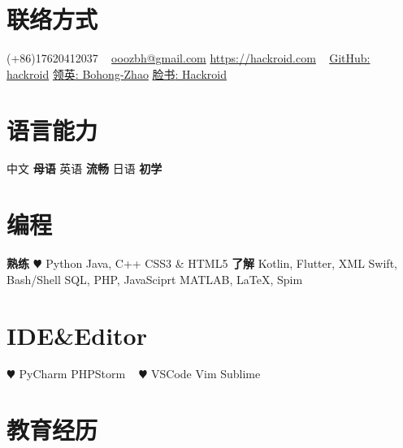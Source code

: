 \documentclass[hidelinks__VERSION__]{adamyi-cv}
\begin{document}



\begin{aside} %
\section{\heir 联络方式}
(+86)17620412037
~
\href{mailto:ooozbh@gmail.com}{ooozbh@gmail.com}
\href{https://hackroid.com}{https://hackroid.com}
~
\href{https://github.com/hackroid}{GitHub: hackroid}
\href{https://www.linkedin.com/in/%E5%8D%9A%E5%BC%98-%E8%B5%B5-b7ab09136/}{\hei 领英\textrm{: Bohong-Zhao}}
\href{https://www.facebook.com/Hackro1d}{\hei 脸书\textrm{: Hackroid}}
\section{\heir 语言能力}
{\hei 中文 \textbf{\hei 母语}
\hei 英语 \textbf{\hei 流畅}
\hei 日语 \textbf{\hei 初学}}
\section{\heir 编程}
\textbf{\hei 熟练}
{\color{red} $\varheart$} Python
Java, C++
CSS3 \& HTML5
\textbf{\hei 了解}
Kotlin, Flutter, XML
Swift, Bash/Shell
SQL, PHP, JavaSciprt
MATLAB, \LaTeX, Spim
\section{IDE\&Editor}
{\color{red} $\varheart$} PyCharm
PHPStorm
~
{\color{red} $\varheart$} VSCode
Vim
Sublime
\versionsection
\end{aside}


\section{\heir 教育\heir 经历}
\end{document}
